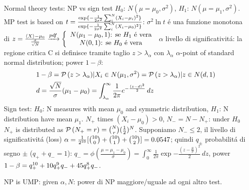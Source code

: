 \documentclass[asd-beamer.tex]{subfiles}%
\begin{document}
\begin{wordonframe}{Normal theory tests: NP vs sign test}
$H_0$: $N(\mu=\mu_0,\sigma^2)$, $H_1$: $N(\mu=\mu_1,\sigma^2)$.
MP test is based on $t=\frac{\text{exp}\{-\frac{1}{2\sigma^2}\sum_i^N(X_i-\mu_i)^2\}}{\text{exp}\{-\frac{1}{2\sigma^2}\sum_i^N(X_i-\mu_0)^2\}}$: $\sigma^2\ln{t}$ \'e una funzione monotona di $z=\frac{\langle X \rangle-\mu_0}{\frac{\sigma}{\sqrt{N}}}\xrightarrow{pdf}\left\{\begin{array}{c}N(\mu_1-\mu_0,1) \text{: se $H_1$ \'e vera}\\
N(0,1) \text{: se $H_0$ \'e vera}
\end{array}\right.$
$\alpha$ livello di significativit\'a: la regione critica C si definisce tramite taglio $z>\lambda_{\alpha}$ con $\lambda_{\alpha}$ $\alpha$-point of standard normal distribution; power $1-\beta$:
\begin{align*}
&1-\beta=\operatorname{\mathcal{P}}{(z>\lambda_{\alpha})|X_i\in N(\mu_1,\sigma^2)}=\operatorname{\mathcal{P}}{(z>\lambda_{\alpha})|z\in N(d,1)}\\
&d=\frac{\sqrt{N}}{\sigma}(\mu_1-\mu_0)=\int_{\lambda_{\alpha}}^{\infty}\frac{1}{2\pi}e^{-\frac{(z-d)^2}{2}}\,dz
\end{align*}
Sign test:
$H_0$: N measures with mean $\mu_0$ and symmetric distribution, $H_1$: N distribution have mean $\mu_1$. $N_+$ times $(X_i-\mu_0)>0$, $N_-=N-N_+$: under $H_0$ $N_+$ is distributed as $\operatorname{\mathcal{P}}{(N_+=r)}=\binom{N}{r}(\frac{1}{2})^N$. Supponiamo $N_-\leq2$, il livello di significativit\'a  (loss) $\alpha=\frac{1}{2^{10}}[\binom{10}{0}+\binom{10}{1}+\binom{10}{2}]=0.0547$; quindi $q_{\pm}$ probabilit\'a di segno $\pm$ ($q_++q_-=1$): $q_-=\phi(\frac{\mu=\mu_1-\mu_0}{\sigma})=\int_0^{\infty}\frac{1}{2\pi}\exp{-\frac{(z-\frac{\mu}{\sigma})^2}{2}}\,dz$, power $1-\beta=q_+^{10}+10q_+^9q_-+45q_+^8q_-$.

NP is UMP: given $\alpha, N$: power di NP maggiore/uguale ad ogni altro test.
\end{wordonframe}
\end{document}
